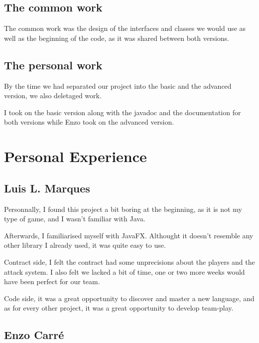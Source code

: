 \documentclass[12pt, a4paper]{report}
\begin{document}
\subsection*{The common work}

The common work was the design of the interfaces and classes we would use as well as the beginning of the code, as it was shared between both versions.

\subsection*{The personal work}

By the time we had separated our project into the basic and the advanced version, we also deletaged work.

I took on the basic version along with the javadoc and the documentation for both versions while Enzo took on the advanced version.

\section*{Personal Experience}

\subsection*{Luis L. Marques}

Personnally, I found this project a bit boring at the beginning, as it is not my type of game, and I wasn't familiar with Java.

Afterwards, I familiarised myself with JavaFX. Althought it doesn't resemble any other library I already used, it was quite easy to use.

Contract side, I felt the contract had some unprecisions about the players and the attack system. I also felt we lacked a bit of time, one or two more weeks would have been perfect for our team.

Code side, it was a great opportunity to discover and master a new language, and as for every other project, it was a great opportunity to develop team-play.

\subsection*{Enzo Carré}
\end{document}
